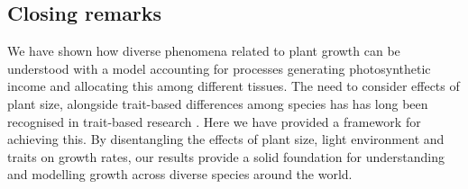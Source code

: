 \documentclass[9pt,twocolumn,twoside]{pnas-new}
\begin{document}
\subsection{Closing remarks}

We have shown how diverse phenomena related to plant growth can be understood with a model accounting for processes generating photosynthetic income and allocating this among different tissues. The need to consider effects of plant size, alongside trait-based differences among species has has long been recognised in trait-based research \cite[e.g.][]{Givnish-1988, Thomas-1999, Moorcroft-2001, Westoby-2002, Enquist-2007}. Here we have provided a framework for achieving this. By disentangling the effects of plant size, light environment and traits on growth rates, our results provide a solid  foundation for understanding and modelling growth across diverse species around the world.
\end{document}
